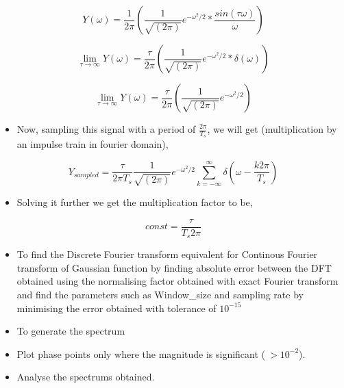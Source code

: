 \documentclass[11pt]{article}
\providecommand{\tightlist}{%
      \setlength{\itemsep}{0pt}\setlength{\parskip}{0pt}}
\begin{document}
\begin{equation}
Y(\omega) = \frac{1}{2\pi}(\frac{1}{\sqrt{(2\pi)}}e^{-\omega^2/2} * \frac{sin(\tau \omega)}{\omega})
\end{equation}

\begin{equation}
\lim_{\tau \to\infty} Y(\omega) = \frac{\tau}{2\pi}(\frac{1}{\sqrt{(2\pi)}}e^{-\omega^2/2} * \delta(\omega))
\end{equation}

\begin{equation}
\lim_{\tau \to\infty} Y(\omega) = \frac{\tau}{2\pi}(\frac{1}{\sqrt{(2\pi)}}e^{-\omega^2/2})
\end{equation}

\begin{itemize}
\tightlist
\item
  Now, sampling this signal with a period of \(\frac{2\pi}{T_s}\), we
  will get (multiplication by an impulse train in fourier domain),
\end{itemize}

\begin{equation}
Y_{sampled} = \frac{\tau}{2\pi T_s}\frac{1}{\sqrt{(2\pi)}}e^{-\omega^2/2} \sum_{k = -\infty}^{\infty}\delta(\omega - \frac{k2\pi}{T_s})
\end{equation}

\begin{itemize}
\tightlist
\item
  Solving it further we get the multiplication factor to be,
\end{itemize}

\begin{equation}
const = \frac{\tau}{T_s 2\pi}
\end{equation}

\begin{itemize}
\tightlist
\item
  To find the Discrete Fourier transform equivalent for Continous
  Fourier transform of Gaussian function by finding absolute error
  between the DFT obtained using the normalising factor obtained with
  exact Fourier transform and find the parameters such as Window\_size
  and sampling rate by minimising the error obtained with tolerance of
  \(10^{-15}\)
\item
  To generate the spectrum
\item
  Plot phase points only where the magnitude is significant
  (\(\ > 10^{-2}\)).
\item
  Analyse the spectrums obtained.
\end{itemize}
\end{document}
